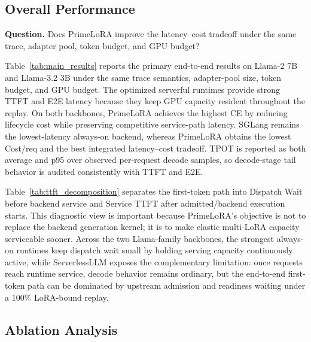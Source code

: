\documentclass[lettersize,journal]{IEEEtran}
\begin{document}
\subsection{Overall Performance}
\label{subsec:overall_performance}

\textbf{Question.}
Does PrimeLoRA improve the latency--cost tradeoff under the same trace, adapter pool, token budget, and GPU budget?


Table~\ref{tab:main_results} reports the primary end-to-end results on Llama-2 7B and Llama-3.2 3B under the same trace semantics, adapter-pool size, token budget, and GPU budget. The optimized serverful runtimes provide strong TTFT and E2E latency because they keep GPU capacity resident throughout the replay. On both backbones, PrimeLoRA achieves the highest CE by reducing lifecycle cost while preserving competitive service-path latency. SGLang remains the lowest-latency always-on backend, whereas PrimeLoRA obtains the lowest Cost/req and the best integrated latency--cost tradeoff. TPOT is reported as both average and p95 over observed per-request decode samples, so decode-stage tail behavior is audited consistently with TTFT and E2E.


Table~\ref{tab:ttft_decomposition} separates the first-token path into Dispatch Wait before backend service and Service TTFT after admitted/backend execution starts. This diagnostic view is important because PrimeLoRA's objective is not to replace the backend generation kernel; it is to make elastic multi-LoRA capacity serviceable sooner. Across the two Llama-family backbones, the strongest always-on runtimes keep dispatch wait small by holding serving capacity continuously active, while ServerlessLLM exposes the complementary limitation: once requests reach runtime service, decode behavior remains ordinary, but the end-to-end first-token path can be dominated by upstream admission and readiness waiting under a 100\% LoRA-bound replay.

\subsection{Ablation Analysis}
\end{document}
